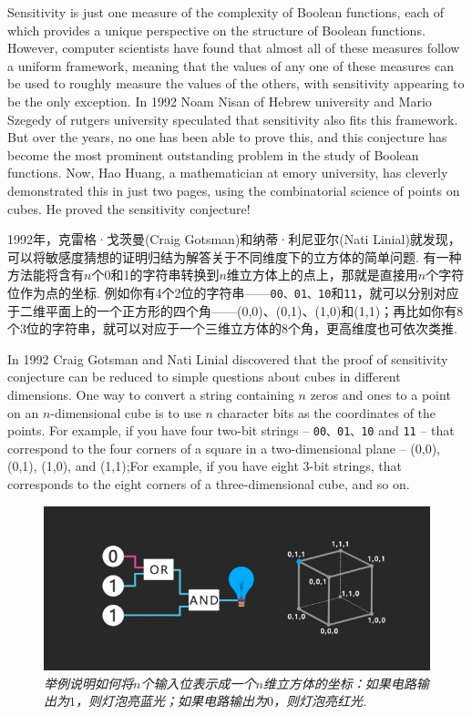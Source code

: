 \begin{multicols}{2}
Sensitivity is just one measure of the complexity of Boolean functions, each of which provides a unique perspective on the structure of Boolean functions. However, computer scientists have found that almost all of these measures follow a uniform framework, meaning that the values of any one of these measures can be used to roughly measure the values of the others, with sensitivity appearing to be the only exception. In 1992 Noam Nisan of Hebrew university and Mario Szegedy of rutgers university speculated that sensitivity also fits this framework. But over the years, no one has been able to prove this, and this conjecture has become the most prominent outstanding problem in the study of Boolean functions. Now, Hao Huang, a mathematician at emory university, has cleverly demonstrated this in just two pages, using the combinatorial science of points on cubes. He proved the sensitivity conjecture!

1992年，克雷格·戈茨曼(Craig Gotsman)和纳蒂·利尼亚尔(Nati Linial)就发现，可以将敏感度猜想的证明归结为解答关于不同维度下的立方体的简单问题. 有一种方法能将含有$n$个0和1的字符串转换到$n$维立方体上的点上，那就是直接用$n$个字符位作为点的坐标. 例如你有4个2位的字符串——\texttt{00、01、10}和\texttt{11}，就可以分别对应于二维平面上的一个正方形的四个角——(0,0)、(0,1)、(1,0)和(1,1)；再比如你有8个3位的字符串，就可以对应于一个三维立方体的8个角，更高维度也可依次类推. 

In 1992 Craig Gotsman and Nati Linial discovered that the proof of sensitivity conjecture can be reduced to simple questions about cubes in different dimensions. One way to convert a string containing $n$ zeros and ones to a point on an $n$-dimensional cube is to use $n$ character bits as the coordinates of the points. For example, if you have four two-bit strings -- \texttt{00、01、10} and \texttt{11} -- that correspond to the four corners of a square in a two-dimensional plane -- (0,0), (0,1), (1,0), and (1,1);For example, if you have eight 3-bit strings, that corresponds to the eight corners of a three-dimensional cube, and so on. 

\begin{figure}[H]
        \centering
      \includegraphics[width=\linewidth]{IMG/201908/1.jpg}
        \caption{ \textit{举例说明如何将$n$个输入位表示成一个$n$维立方体的坐标：如果电路输出为$1$，则灯泡亮蓝光；如果电路输出为$0$，则灯泡亮红光. }}
    \end{figure}
    

\end{multicols}
